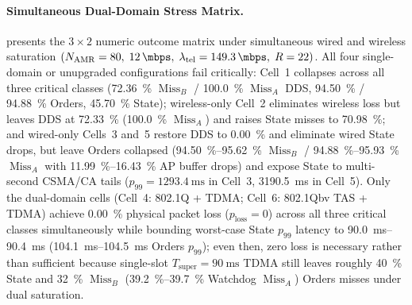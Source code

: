 \documentclass[11pt,a4paper]{article}
\newcommand{\Namr}{\ensuremath{N_{\mathrm{AMR}}}}
\newcommand{\ltel}{\ensuremath{\lambda_{\mathrm{tel}}}}
\newcommand{\Tsuper}{\ensuremath{T_{\mathrm{super}}}}
\newcommand{\MissA}{\ensuremath{\operatorname{Miss}_A}}
\newcommand{\MissB}{\ensuremath{\operatorname{Miss}_B}}
\newcommand{\ploss}{\ensuremath{p_{\mathrm{loss}}}}
\begin{document}
\paragraph{Simultaneous Dual-Domain Stress Matrix.}
 presents the $3 \times 2$ numeric outcome matrix under simultaneous wired and wireless saturation $(\Namr=80,\; \qty{12}{\mbps},\; \ltel=\qty{149.3}{\mbps},\; R=22)$. All four single-domain or unupgraded configurations fail critically: Cell~1 collapses across all three critical classes (\qty{72.36}{\percent} $\MissB$ / \qty{100.0}{\percent} $\MissA$ DDS, \qty{94.50}{\percent} / \qty{94.88}{\percent} Orders, \qty{45.70}{\percent} State); wireless-only Cell~2 eliminates wireless loss but leaves DDS at \qty{72.33}{\percent} (\qty{100.0}{\percent} $\MissA$) and raises State misses to \qty{70.98}{\percent}; and wired-only Cells~3 and~5 restore DDS to \qty{0.00}{\percent} and eliminate wired State drops, but leave Orders collapsed (\qtyrange{94.50}{95.62}{\percent} $\MissB$ / \qtyrange{94.88}{95.93}{\percent} $\MissA$ with \qtyrange{11.99}{16.43}{\percent} AP buffer drops) and expose State to multi-second CSMA/CA tails ($p_{99} = \qty{1293.4}{\milli\second}$ in Cell~3, \qty{3190.5}{\milli\second} in Cell~5). Only the dual-domain cells (Cell~4: 802.1Q + TDMA; Cell~6: 802.1Qbv TAS + TDMA) achieve \qty{0.00}{\percent} physical packet loss ($\ploss = 0$) across all three critical classes simultaneously while bounding worst-case State $p_{99}$ latency to \qtyrange{90.0}{90.4}{\milli\second} (\qtyrange{104.1}{104.5}{\milli\second} Orders $p_{99}$); even then, zero loss is necessary rather than sufficient because single-slot $\Tsuper = \qty{90}{\milli\second}$ TDMA still leaves roughly \qty{40}{\percent} State and \qty{32}{\percent} $\MissB$ (\qtyrange{39.2}{39.7}{\percent} Watchdog $\MissA$) Orders misses under dual saturation.
\end{document}
